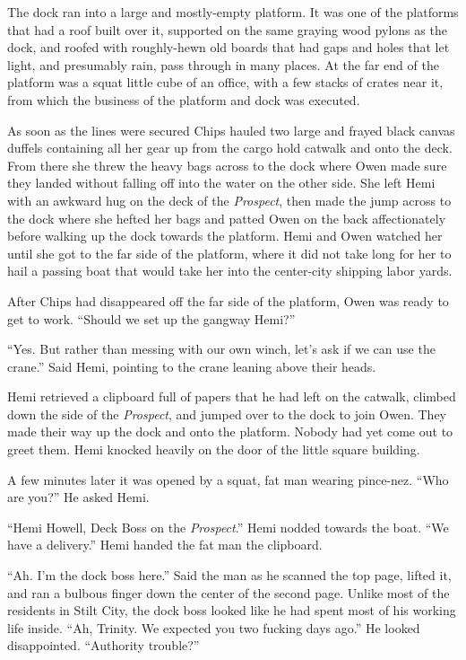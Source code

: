 \documentclass[]{scrbook}
\begin{document}
The dock ran into a large and mostly-empty platform. It was one of the
platforms that had a roof built over it, supported on the same graying
wood pylons as the dock, and roofed with roughly-hewn old boards that
had gaps and holes that let light, and presumably rain, pass through in
many places. At the far end of the platform was a squat little cube of
an office, with a few stacks of crates near it, from which the business
of the platform and dock was executed.

As soon as the lines were secured Chips hauled two large and frayed
black canvas duffels containing all her gear up from the cargo hold
catwalk and onto the deck. From there she threw the heavy bags across to
the dock where Owen made sure they landed without falling off into the
water on the other side. She left Hemi with an awkward hug on the deck
of the \emph{Prospect}, then made the jump across to the dock where she
hefted her bags and patted Owen on the back affectionately before
walking up the dock towards the platform. Hemi and Owen watched her
until she got to the far side of the platform, where it did not take
long for her to hail a passing boat that would take her into the
center-city shipping labor yards.

After Chips had disappeared off the far side of the platform, Owen was
ready to get to work. ``Should we set up the gangway Hemi?''

``Yes. But rather than messing with our own winch, let's ask if we can
use the crane.'' Said Hemi, pointing to the crane leaning above their
heads.

Hemi retrieved a clipboard full of papers that he had left on the
catwalk, climbed down the side of the \emph{Prospect}, and jumped over
to the dock to join Owen. They made their way up the dock and onto the
platform. Nobody had yet come out to greet them. Hemi knocked heavily on
the door of the little square building.

A few minutes later it was opened by a squat, fat man wearing pince-nez.
``Who are you?'' He asked Hemi.

``Hemi Howell, Deck Boss on the \emph{Prospect}.'' Hemi nodded towards
the boat. ``We have a delivery.'' Hemi handed the fat man the clipboard.

``Ah. I'm the dock boss here.'' Said the man as he scanned the top page,
lifted it, and ran a bulbous finger down the center of the second page.
Unlike most of the residents in Stilt City, the dock boss looked like he
had spent most of his working life inside. ``Ah, Trinity. We expected
you two fucking days ago.'' He looked disappointed. ``Authority
trouble?''
\end{document}
